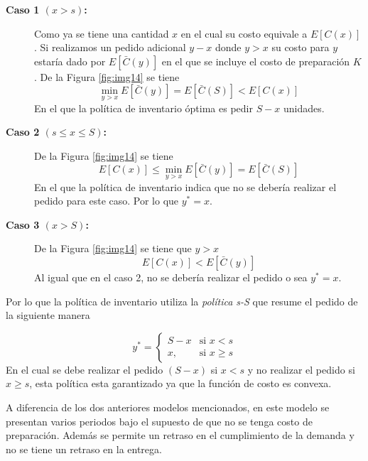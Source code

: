 \begin{description}
    \item[\textbf{Caso 1 $(x > s)$:}] Como ya se tiene una cantidad $x$ en el cual su costo equivale a $E[C(x)]$. Si realizamos un pedido adicional $y-x$ donde $y > x$ su costo para $y$ estaría dado por $E[\bar{C}(y)]$ en el que se incluye el costo de preparación $K$. De la Figura \ref{fig:img14} se tiene
    $$
        \min_{y>x} E[\bar{C}(y)] = E[\bar{C}(S)] < E[C(x)]
    $$
    En el que la política de inventario óptima es pedir $S-x$ unidades.

    \item[\textbf{Caso 2 $(s \leq x \leq S)$:}] De la Figura \ref{fig:img14} se tiene
    $$
        E[C(x)] \leq \min_{y>x}E[\bar{C}(y)] = E[\bar{C}(S)]
    $$
    En el que la política de inventario indica que no se debería realizar el pedido para este caso. Por lo que $y^* = x$.

    \item[\textbf{Caso 3 $(x > S)$:}] De la Figura \ref{fig:img14} se tiene que $y > x$
    $$
        E[C(x)] < E[\bar{C}(y)]
    $$
    Al igual que en el caso 2, no se debería realizar el pedido o sea $y^* = x$.
\end{description}

Por lo que la política de inventario utiliza la \textsl{política s-S} que resume el pedido de la siguiente manera

\begin{equation}
	y^* =
	\left\{
	\begin{array}{ll}
		S-x & \text{si } x < s \\
		x, & \text{si } x \geq s
	\end{array}
	\right.
\end{equation}
En el cual se debe realizar el pedido $(S-x)$ si $x < s$ y no realizar el pedido si $x \geq s$, esta política esta garantizado ya que la función de costo es convexa.

A diferencia de los dos anteriores modelos mencionados, en este modelo se presentan varios periodos bajo el supuesto de que no se tenga costo de preparación. Además se permite un retraso en el cumplimiento de la demanda y no se tiene un retraso en la entrega.

